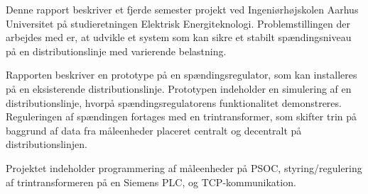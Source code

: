 
Denne rapport beskriver et fjerde semester projekt ved Ingeniørhøjskolen Aarhus Universitet på studieretningen Elektrisk Energiteknologi. Problemstillingen der arbejdes med er, at udvikle et system som kan sikre et stabilt spændingsniveau på en distributionslinje med varierende belastning.

Rapporten beskriver en prototype på en spændingsregulator, som kan installeres på en eksisterende distributionslinje. Prototypen indeholder en simulering af en distributionslinje, hvorpå spændingsregulatorens funktionalitet demonstreres. Reguleringen af spændingen fortages med en trintransformer, som skifter trin på baggrund af data fra måleenheder placeret centralt og decentralt på distributionslinjen.

Projektet indeholder programmering af måleenheder på PSOC, styring/regulering af trintransformeren på en Siemens PLC, og TCP-kommunikation. 